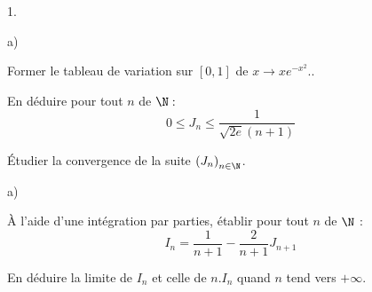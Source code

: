 \documentclass[11pt]{article}%
\begin{document}
\begin{noliste}{1.}
 \setlength{\itemsep}{4mm}
\item 

\begin{noliste}{a)}
 \setlength{\itemsep}{2mm}
\item Former le tableau de variation sur $[0,1]$ de $x\rightarrow
xe^{-x^{2}} $..

\item En déduire pour tout $n$ de $\N :$
\[
0\leq J_{n}\leq \frac{1}{\sqrt{2e}(n + 1)}
\]

\item Étudier la convergence de la suite $\left( J_{n}\right)_{n\in
\N}$.
\end{noliste}

\item 

\begin{noliste}{a)}
 \setlength{\itemsep}{2mm}
\item À l'aide d'une intégration par parties, établir pour tout $n$ de
$\N$ : 
\[
I_{n} = \frac{1}{n + 1}-\frac{2}{n + 1}J_{n + 1}
\]

\item En déduire la limite de $I_{n}$ et celle de $n.I_{n}$ quand $n$
tend
vers $ + \infty $.
\end{noliste}
\end{noliste}

\label{fin}
\end{document}
